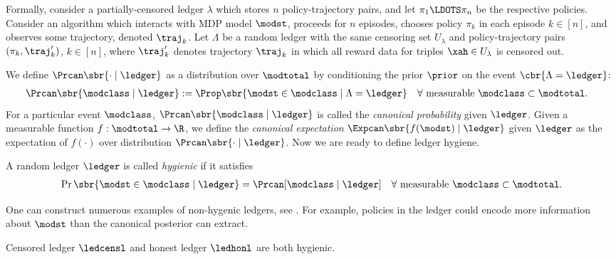 Formally, consider a partially-censored ledger $\lambda$ which stores $n$ policy-trajectory pairs, and let $\pi_1 \LDOTS \pi_n$ be the respective policies. Consider an algorithm which interacts with MDP model $\modst$, proceeds for $n$ episodes, chooses policy $\pi_k$ in each episode $k\in [n]$, and observes some trajectory, denoted $\traj_k$. Let $\Lambda$ be a random ledger with the same censoring set $U_\lambda$ and policy-trajectory pairs
    $(\pi_k,\traj'_k)$, $k\in[n]$,
where $\traj'_k$ denotes trajectory $\traj_k$ in which all reward data for triples $\xah\in U_\lambda$ is censored out.


We define $\Prcan\sbr{ \cdot \mid \ledger }$ as a distribution over $\modtotal$ by conditioning the prior $\prior$ on the event
$\cbr{\Lambda = \ledger}$:
\begin{align}\label{eq:canon-posterior-defn}
\Prcan\sbr{\modclass \mid \ledger }
    &:= \Prop \sbr{ \modst \in \modclass \mid \Lambda = \ledger }
    \quad\forall \text{ measurable }\modclass\subset\modtotal.
\end{align}
For a particular event $\modclass$,
    $\Prcan\sbr{\modclass \mid \ledger }$
is called the \emph{canonical probability} given $\ledger$. Given a measurable function $f:\modtotal\to \R$, we define the \emph{canonical expectation}
    $\Expcan\sbr{f(\modst)\mid \ledger}$
given $\ledger$ as the expectation of $f(\cdot)$ over distribution $\Prcan\sbr{ \cdot \mid \ledger }$.
Now we are ready to define ledger hygiene.

\begin{definition}\label{def:hygiene}
A random ledger $\ledger$ is called \emph{hygienic} if it satisfies
\begin{align}\label{eq:hygiene}
 \Pr\sbr{\modst \in \modclass \mid \ledger}  = \Prcan[\modclass \mid \ledger ]
 \quad\forall \text{ measurable }\modclass\subset\modtotal.
\end{align}
\end{definition}

One can construct numerous examples of non-hygenic ledgers, see . For example, policies in the ledger could encode more information about $\modst$ than the canonical posterior can extract.

\begin{lemma}\label{lem:data_hygiene}
Censored ledger $\ledcensl$ and honest ledger $\ledhonl$ are both hygienic.
\end{lemma}

